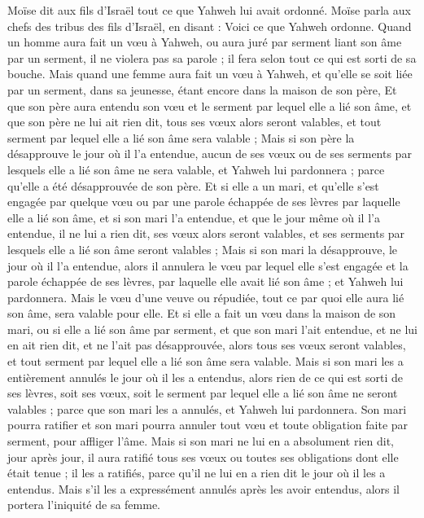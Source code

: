 \begin{multicols}{2}
\VerseOne{}Moïse dit aux fils d’Israël tout ce que Yahweh lui avait ordonné.
Moïse parla aux chefs des tribus des fils d'Israël, en disant : Voici ce que Yahweh ordonne.
Quand un homme aura fait un vœu à Yahweh, ou aura juré par serment liant son âme par un serment, il ne violera pas sa parole ; il fera selon tout ce qui est sorti de sa bouche.
Mais quand une femme aura fait un vœu à Yahweh, et qu’elle se soit liée par un serment, dans sa jeunesse, étant encore dans la maison de son père,
Et que son père aura entendu son vœu et le serment par lequel elle a lié son âme, et que son père ne lui ait rien dit, tous ses vœux alors seront valables, et tout serment par lequel elle a lié son âme sera valable ;
Mais si son père la désapprouve le jour où il l’a entendue, aucun de ses vœux ou de ses serments par lesquels elle a lié son âme ne sera valable, et Yahweh lui pardonnera ; parce qu’elle a été désapprouvée de son père.
Et si elle a un mari, et qu’elle s’est engagée par quelque vœu ou par une parole échappée de ses lèvres par laquelle elle a lié son âme,
et si son mari l’a entendue, et que le jour même où il l’a entendue, il ne lui a rien dit, ses vœux alors seront valables, et ses serments par lesquels elle a lié son âme seront valables ;
Mais si son mari la désapprouve, le jour où il l'a entendue, alors il annulera le vœu par lequel elle s’est engagée et la parole échappée de ses lèvres, par laquelle elle avait lié son âme ; et Yahweh lui pardonnera.
Mais le vœu d’une veuve ou répudiée, tout ce par quoi elle aura lié son âme, sera valable pour elle.
Et si elle a fait un vœu dans la maison de son mari, ou si elle a lié son âme par serment,
et que son mari l’ait entendue, et ne lui en ait rien dit, et ne l’ait pas désapprouvée, alors tous ses vœux seront valables, et tout serment par lequel elle a lié son âme sera valable.
Mais si son mari les a entièrement annulés le jour où il les a entendus, alors rien de ce qui est sorti de ses lèvres, soit ses vœux, soit le serment par lequel elle a lié son âme ne seront valables ; parce que son mari les a annulés, et Yahweh lui pardonnera.
Son mari pourra ratifier et son mari pourra annuler tout vœu et toute obligation faite par serment, pour affliger l’âme.
Mais si son mari ne lui en a absolument rien dit, jour après jour, il aura ratifié tous ses vœux ou toutes ses obligations dont elle était tenue ; il les a ratifiés, parce qu’il ne lui en a rien dit le jour où il les a entendus.
Mais s’il les a expressément annulés après les avoir entendus, alors il portera l’iniquité de sa femme.

\end{multicols}

